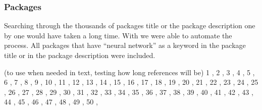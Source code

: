 \hypertarget{packages}{%
\subsubsection{Packages}\label{packages}}

Searching through the thousands of packages title or the package
description one by one would have taken a long time. With
 \citep{R-RWsearch} we were able to automate the
process. All packages that have ``neural network'' as a keyword in the
package title or in the package description were included.

(to use when needed in text, testing how long references will be) 1
 \citep{R-AMORE}, 2  \citep{R-ANN2}, 3
 \citep{R-appnn}, 4 
\citep{R-autoencoder}, 5  \citep{R-automl}, 6
 \citep{R-BNN}, 7  \citep{R-brnn}, 8
 \citep{R-Buddle}, 9 
\citep{R-CaDENCE}, 10 \citep{R-cld2}, 11
\citep{R-cld3}, 12 \citep{R-condmixt},
13 \citep{R-DamiaNN}, 14 \citep{R-deep},
15 \citep{R-deepdive}, 16
\citep{R-deepnet}, 17 \citep{R-deepNN}, 18
\citep{R-DNMF}, 19 \citep{R-elmNNRcpp},
20 \citep{R-ELMR}, 21
\citep{R-EnsembleBase}, 22 \citep{R-evclass},
23 \citep{R-gamlss.add}, 24
\citep{R-gcForest}, 25 \citep{R-GMDH}, 26
\citep{R-GMDH2}, 27 \citep{R-GMDHreg}, 28
\citep{R-gnn}, 29 \citep{R-grnn}, 30
\citep{R-h2o}, 31 \citep{R-hybridEnsemble},
32 \citep{R-isingLenzMC}, 33
\citep{R-keras}, 34 \citep{R-kerasR}, 35
\citep{R-leabRa}, 36 \citep{R-learNN},
37 \citep{R-LilRhino}, 38
\citep{R-minpack.lm}, 39 \citep{R-MachineShop},
40 \citep{R-monmlp}, 41
\citep{R-neural}, 42 \citep{R-neuralnet},
43 \citep{R-NeuralNetTools},
44 \citep{R-NeuralSens}, 45
\citep{R-NlinTS}, 46 \citep{R-nlsr}, 47
\citep{R-nnet}, 48 \citep{R-nnetpredint},
49 \citep{R-nnfor}, 50 \citep{R-nntrf},
